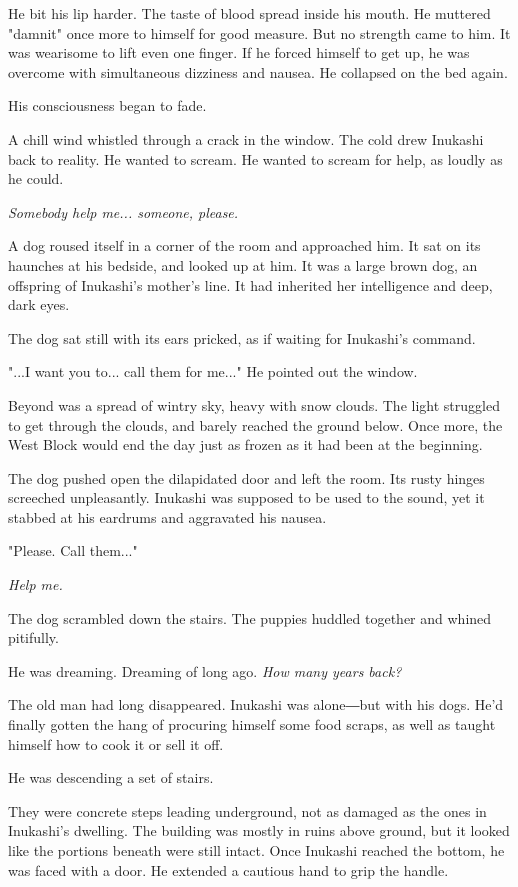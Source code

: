 He bit his lip harder. The taste of blood spread inside his mouth. He
muttered "damnit" once more to himself for good measure. But no strength
came to him. It was wearisome to lift even one finger. If he forced
himself to get up, he was overcome with simultaneous dizziness and
nausea. He collapsed on the bed again.

His consciousness began to fade.

A chill wind whistled through a crack in the window. The cold drew
Inukashi back to reality. He wanted to scream. He wanted to scream for
help, as loudly as he could.

\emph{Somebody help me... someone, please.}

A dog roused itself in a corner of the room and approached him. It sat
on its haunches at his bedside, and looked up at him. It was a large
brown dog, an offspring of Inukashi's mother's line. It had inherited
her intelligence and deep, dark eyes.

The dog sat still with its ears pricked, as if waiting for Inukashi's
command.

"...I want you to... call them for me..." He pointed out the window.

Beyond was a spread of wintry sky, heavy with snow clouds. The light
struggled to get through the clouds, and barely reached the ground
below. Once more, the West Block would end the day just as frozen as it
had been at the beginning.

The dog pushed open the dilapidated door and left the room. Its rusty
hinges screeched unpleasantly. Inukashi was supposed to be used to the
sound, yet it stabbed at his eardrums and aggravated his nausea.

"Please. Call them..."

\emph{Help me.}

The dog scrambled down the stairs. The puppies huddled together and
whined pitifully.

\myspace

He was dreaming. Dreaming of long ago. \emph{How many years back?}

The old man had long disappeared. Inukashi was alone―but with his dogs.
He'd finally gotten the hang of procuring himself some food scraps, as
well as taught himself how to cook it or sell it off.

He was descending a set of stairs.

They were concrete steps leading underground, not as damaged as the ones
in Inukashi's dwelling. The building was mostly in ruins above ground,
but it looked like the portions beneath were still intact. Once Inukashi
reached the bottom, he was faced with a door. He extended a cautious
hand to grip the handle.

